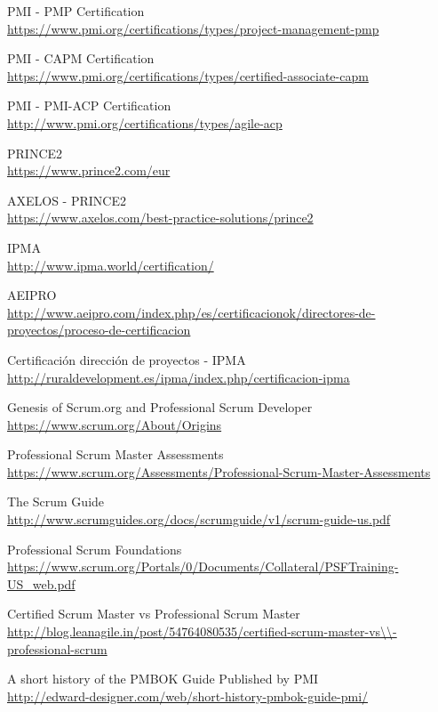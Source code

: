 \begin{thebibliography}{9}
	PMI - PMP Certification\\
	\url{https://www.pmi.org/certifications/types/project-management-pmp}
	
	PMI - CAPM Certification\\
	\url{https://www.pmi.org/certifications/types/certified-associate-capm}
	
	PMI - PMI-ACP Certification\\
	\url{http://www.pmi.org/certifications/types/agile-acp}
	
	PRINCE2\\
	\url{https://www.prince2.com/eur}
	
	AXELOS - PRINCE2\\
	\url{https://www.axelos.com/best-practice-solutions/prince2}
	
	IPMA\\
	\url{http://www.ipma.world/certification/}
	
	AEIPRO\\
	\url{http://www.aeipro.com/index.php/es/certificacionok/directores-de-proyectos/proceso-de-certificacion}
	
	Certificación dirección de proyectos - IPMA\\
	\url{http://ruraldevelopment.es/ipma/index.php/certificacion-ipma}
	
	Genesis of Scrum.org and Professional Scrum Developer\\
	\url{https://www.scrum.org/About/Origins}
	
	Professional Scrum Master Assessments\\
	\url{https://www.scrum.org/Assessments/Professional-Scrum-Master-Assessments}
	
	The Scrum Guide\\
	\url{http://www.scrumguides.org/docs/scrumguide/v1/scrum-guide-us.pdf}
	
	Professional Scrum Foundations\\
	\url{https://www.scrum.org/Portals/0/Documents/Collateral/PSFTraining-US_web.pdf}
	
	Certified Scrum Master vs Professional Scrum Master\\  
	\url{http://blog.leanagile.in/post/54764080535/certified-scrum-master-vs\\-professional-scrum}
	
	A short history of the PMBOK Guide Published by PMI\\
	\url{http://edward-designer.com/web/short-history-pmbok-guide-pmi/}
\end{thebibliography}